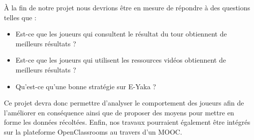 	À la fin de notre projet nous devrions être en mesure de répondre à des questions telles que :
	\begin{itemize}
		\item Est-ce que les joueurs qui consultent le résultat du tour obtiennent de meilleurs résultats ?
		\item Est-ce que les joueurs qui utilisent les ressources vidéos obtiennent de meilleurs résultats ?
		\item Qu’est-ce qu’une bonne stratégie sur E-Yaka ?
	\end{itemize}

	Ce projet devra donc permettre d’analyser le comportement des joueurs afin de l’améliorer en conséquence ainsi que de proposer des moyens pour mettre en forme les données récoltées. Enfin, nos travaux pourraient également être intégrés sur la plateforme OpenClassrooms au travers d’un MOOC.
